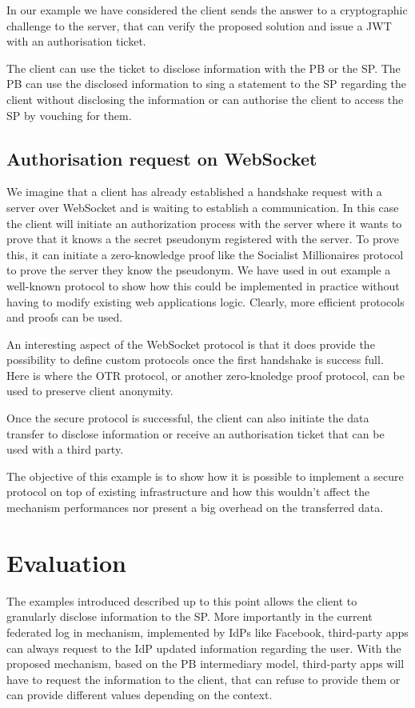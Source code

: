 In our example we have considered the client sends the answer to a cryptographic challenge to the server, that can verify the proposed solution and issue a JWT with an authorisation ticket. 

The client can use the ticket to disclose information with the PB or the SP. The PB can use the disclosed information to sing a statement to the SP regarding the client without disclosing the information or can authorise the client to access the SP by vouching for them.

\subsection{Authorisation request on WebSocket}

We imagine that a client has already established a handshake request with a server over WebSocket and is waiting to establish a communication. In this case the client will initiate an authorization process with the server where it wants to prove that it knows a the secret pseudonym registered with the server. To prove this, it can initiate a zero-knowledge proof like the Socialist Millionaires protocol to prove the server they know the pseudonym. 
We have used in out example a well-known protocol to show how this could be implemented in practice without having to modify existing web applications logic. Clearly, more efficient protocols and proofs can be used.

An interesting aspect of the WebSocket protocol is that it does provide the possibility to define custom protocols once the first handshake is success full. Here is where the OTR protocol, or another zero-knoledge proof protocol, can be used to preserve client anonymity. 

Once the secure protocol is successful, the client can also initiate the data transfer to disclose information or receive an authorisation ticket that can be used with a third party.

The objective of this example is to show how it is possible to implement a secure protocol on top of existing infrastructure and how this wouldn't affect the mechanism performances nor present a big overhead on the transferred data.

\section{Evaluation}

The examples introduced described up to this point allows the client to granularly disclose information to the SP. More importantly in the current federated log in mechanism, implemented by IdPs like Facebook, third-party apps can always request to the IdP updated information regarding the user. With the proposed mechanism, based on the PB intermediary model, third-party apps will have to request the information to the client, that can refuse to provide them or can provide different values depending on the context. 

